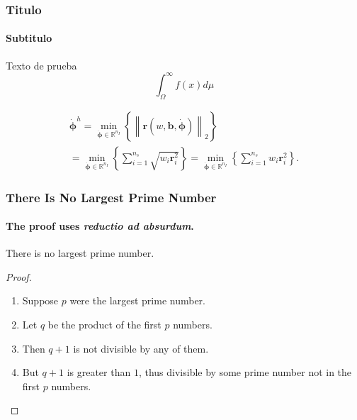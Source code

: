 \documentclass[]{beamer} %
\begin{document}
\begin{frame}
	\frametitle{Titulo}
	\framesubtitle{Subtitulo} 
  
  Texto de prueba
  \begin{equation}
  	\int_{\Omega}^{\infty}f(x)d\mu
  \end{equation}

  \begin{multline}
  	\label{LeastSquares}
  	\dot{\mathbf{\phi}}^h=\min_{\dot{\mathbf{\phi}}\in\mathbb{R}^{n_{I}}} \left\lbrace \left\|\mathbf{r}(w,\mathbf{b},\dot{\mathbf{\phi}}) \right\|_2  \right\rbrace\\
  	=\min_{\dot{\mathbf{\phi}}\in\mathbb{R}^{n_{I}}} \left\lbrace \sum_{i=1}^{n_s} \sqrt{w_i\mathbf{r}_i^2}  \right\rbrace =\min_{\dot{\mathbf{\phi}}\in\mathbb{R}^{n_{I}}} \left\lbrace \sum_{i=1}^{n_s} {w_i\mathbf{r}_i^2}  \right\rbrace.
  \end{multline}

  
\end{frame}
	
\begin{frame}
	\frametitle{There Is No Largest Prime Number}
	\framesubtitle{The proof uses \textit{reductio ad absurdum}.}
	\begin{theorem}
		There is no largest prime number.
	\end{theorem}
	\begin{proof}
		\begin{enumerate}
			\item<1-> Suppose $p$ were the largest prime number.
			\item<2-> Let $q$ be the product of the first $p$ numbers.
			\item<3-> Then $q + 1$ is not divisible by any of them.
			\item<1-> But $q + 1$ is greater than $1$, thus divisible by some prime
			number not in the first $p$ numbers.\qedhere
		\end{enumerate}
	\end{proof}
\end{frame}	
	
	
\end{document}
